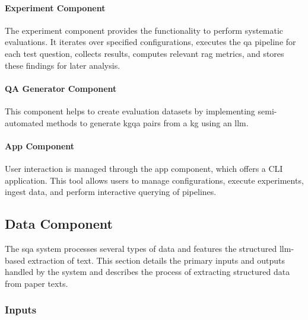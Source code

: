 \paragraph{Experiment Component}
The experiment component provides the functionality to perform systematic evaluations. It iterates over specified configurations, executes the \gls{qa} pipeline for each test question, collects results, computes relevant \gls{rag} metrics, and stores these findings for later analysis.

\paragraph{QA Generator Component}
This component helps to create evaluation datasets by implementing semi-automated methods to generate \gls{kgqa} pairs from a \gls{kg} using an \gls{llm}.

\paragraph{App Component}
User interaction is managed through the app component, which offers a CLI application. This tool allows users to manage configurations, execute experiments, ingest data, and perform interactive querying of pipelines.

\subsection{Data Component}
\label{sec:sqas_architecture_inputs_outputs}

The \gls{sqa} system processes several types of data and features the structured \gls{llm}-based extraction of text. This section details the primary inputs and outputs handled by the system and describes the process of extracting structured data from paper texts.

\subsubsection{Inputs}

